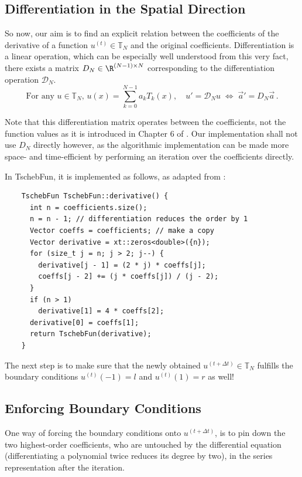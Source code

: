 \documentclass[12pt, a4paper]{article}
\newcommand{\tschebfun}{\textcolor{themecolor3}{TschebFun}\xspace}
\begin{document}
  \subsection{Differentiation in the Spatial Direction}
  So now, our aim is to find an explicit relation between the coefficients of the derivative of a function $u^{(t)} \in \mathbb{T}_N$ and the original coefficients.
  Differentiation is a linear operation, which can be especially well understood from this very fact, there exists a matrix $D_N \in \R^{(N-1) \times N}$ corresponding to the differentiation operation $\mathcal{D}_N$.
  $$\text{For any } u \in \mathbb{T}_N,\, u(x) = \sum_{k=0}^{N-1} a_k T_k(x), \quad u' = \mathcal{D}_N u \;\Leftrightarrow\; \vec{a}' = D_N \vec{a} \,.$$

  Note that this differentiation matrix operates between the coefficients, not the function values as it is introduced in Chapter 6 of \cite{spectralmethods}.
  Our implementation shall not use $D_N$ directly however, as the algorithmic implementation can be made more space- and time-efficient by performing an iteration over the coefficients directly.

  In \tschebfun, it is implemented as follows, as adapted from \cite{numpy}:
  \begin{verbatim}
    TschebFun TschebFun::derivative() {
      int n = coefficients.size();
      n = n - 1; // differentiation reduces the order by 1
      Vector coeffs = coefficients; // make a copy
      Vector derivative = xt::zeros<double>({n});
      for (size_t j = n; j > 2; j--) {
        derivative[j - 1] = (2 * j) * coeffs[j];
        coeffs[j - 2] += (j * coeffs[j]) / (j - 2);
      }
      if (n > 1)
        derivative[1] = 4 * coeffs[2];
      derivative[0] = coeffs[1];
      return TschebFun(derivative);
    }
  \end{verbatim}

  The next step is to make sure that the newly obtained $u^{(t+\Delta t)} \in \mathbb{T}_N$ fulfills the boundary conditions $u^{(t)}(-1) = l$ and $u^{(t)}(1) = r$ as well!

  \subsection{Enforcing Boundary Conditions}
  One way of forcing the boundary conditions onto $u^{(t+\Delta t)}$, is to pin down the two highest-order coefficients, who are untouched by the differential equation (differentiating a polynomial twice reduces its degree by two), in the series representation after the iteration.
\end{document}
